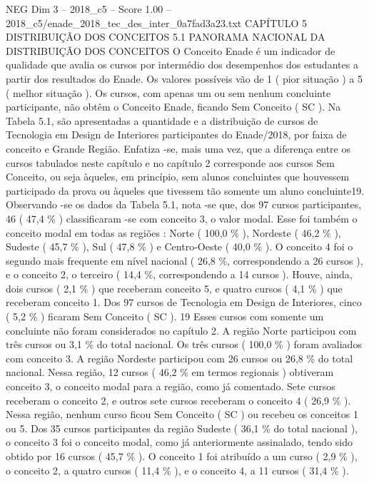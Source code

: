 \begin{textsample}{NEG Dim 3 – 2018\_c5 – Score 1.00 – 2018\_c5/enade\_2018\_tec\_des\_inter\_0a7fad3a23.txt}  \label{ex:f3_neg_098}
CAPÍTULO 5 DISTRIBUIÇÃO DOS CONCEITOS 5.1 PANORAMA NACIONAL DA DISTRIBUIÇÃO DOS CONCEITOS O Conceito Enade é um indicador de qualidade que avalia os cursos por intermédio dos desempenhos dos estudantes a partir dos resultados do Enade.
Os valores possíveis vão de 1 ( pior situação ) a 5 ( melhor situação ).
Os cursos, com apenas um ou sem nenhum concluinte participante, não obtêm o Conceito Enade, ficando Sem Conceito ( SC ).
Na Tabela 5.1, são apresentadas a quantidade e a distribuição de cursos de Tecnologia em Design de Interiores participantes do Enade/2018, por faixa de conceito e Grande Região.
Enfatiza -se, mais uma vez, que a diferença entre os cursos tabulados neste capítulo e no capítulo 2 corresponde aos cursos Sem Conceito, ou seja àqueles, em princípio, sem alunos concluintes que houvessem participado da prova ou àqueles que tivessem tão somente um aluno concluinte19.
Observando -se os dados da Tabela 5.1, nota -se que, dos 97 cursos participantes, 46 ( 47,4 \% ) classificaram -se com conceito 3, o valor modal.
Esse foi também o conceito modal em todas as regiões : Norte ( 100,0 \% ), Nordeste ( 46,2 \% ), Sudeste ( 45,7 \% ), Sul ( 47,8 \% ) e Centro-Oeste ( 40,0 \% ).
O conceito 4 foi o segundo mais frequente em nível nacional ( 26,8 \%, correspondendo a 26 cursos ), e o conceito 2, o terceiro ( 14,4 \%, correspondendo a 14 cursos ).
Houve, ainda, dois cursos ( 2,1 \% ) que receberam conceito 5, e quatro cursos ( 4,1 \% ) que receberam conceito 1.
Dos 97 cursos de Tecnologia em Design de Interiores, cinco ( 5,2 \% ) ficaram Sem Conceito ( SC ). 19 Esses cursos com somente um concluinte não foram considerados no capítulo 2.
A região Norte participou com três cursos ou 3,1 \% do total nacional.
Os três cursos ( 100,0 \% ) foram avaliados com conceito 3.
A região Nordeste participou com 26 cursos ou 26,8 \% do total nacional.
Nessa região, 12 cursos ( 46,2 \% em termos regionais ) obtiveram conceito 3, o conceito modal para a região, como já comentado.
Sete cursos receberam o conceito 2, e outros sete cursos receberam o conceito 4 ( 26,9 \% ).
Nessa região, nenhum curso ficou Sem Conceito ( SC ) ou recebeu os conceitos 1 ou 5.
Dos 35 cursos participantes da região Sudeste ( 36,1 \% do total nacional ), o conceito 3 foi o conceito modal, como já anteriormente assinalado, tendo sido obtido por 16 cursos ( 45,7 \% ).
O conceito 1 foi atribuído a um curso ( 2,9 \% ), o conceito 2, a quatro cursos ( 11,4 \% ), e o conceito 4, a 11 cursos ( 31,4 \% ).

\end{textsample}
